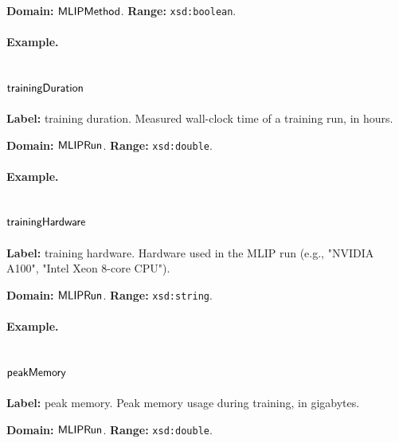 \textbf{Domain:} $\mathsf{MLIPMethod}$.
\textbf{Range:} \texttt{xsd:boolean}.

\paragraph{Example.}

\subsection{$\mathsf{trainingDuration}$}
\label{sec:term-trainingDuration}

\textbf{Label:} training duration.
Measured wall-clock time of a training run, in hours.

\textbf{Domain:} $\mathsf{MLIPRun}$.
\textbf{Range:} \texttt{xsd:double}.

\paragraph{Example.}

\subsection{$\mathsf{trainingHardware}$}
\label{sec:term-trainingHardware}

\textbf{Label:} training hardware.
Hardware used in the MLIP run (e.g., "NVIDIA A100", "Intel Xeon 8-core CPU").

\textbf{Domain:} $\mathsf{MLIPRun}$.
\textbf{Range:} \texttt{xsd:string}.

\paragraph{Example.}

\subsection{$\mathsf{peakMemory}$}
\label{sec:term-peakMemory}

\textbf{Label:} peak memory.
Peak memory usage during training, in gigabytes.

\textbf{Domain:} $\mathsf{MLIPRun}$.
\textbf{Range:} \texttt{xsd:double}.

